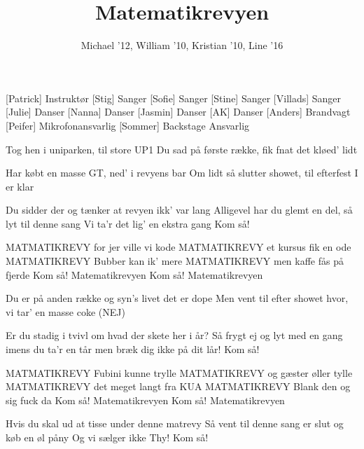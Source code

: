 \documentclass[a4paper,11pt]{article}
\title{Matematikrevyen}
\author{Michael '12, William '10, Kristian '10, Line '16}
\begin{document}
\maketitle

\begin{roles}
[Patrick] Instruktør
[Stig] Sanger
[Sofie] Sanger
[Stine] Sanger
[Villads] Sanger
[Julie] Danser
[Nanna] Danser
[Jasmin] Danser
[AK] Danser
[Anders] Brandvagt
[Peifer] Mikrofonansvarlig
[Sommer] Backstage Ansvarlig
\end{roles}

\begin{song}
 Tog hen i uniparken, til store UP1
 Du sad på første række, fik fnat det kløed' lidt

 Har købt en masse GT, ned' i revyens bar 
  Om lidt så slutter showet, til efterfest I er klar

 Du sidder der og tænker at revyen ikk' var lang
Alligevel har du glemt en del, så lyt til denne sang
 Vi ta'r det lig' en ekstra gang
 Kom så!

 MATMATIKREVY 
 for jer ville vi kode
 MATMATIKREVY 
 et kursus fik en ode
 MATMATIKREVY 
 Bubber kan ik' mere
 MATMATIKREVY
 men kaffe fås på fjerde
 Kom så!
 Matematikrevyen
 Kom så!
Matematikrevyen

 Du er på anden række og syn's livet det er dope
 Men vent til efter showet hvor, vi tar' en masse coke  (NEJ)

 Er du stadig i tvivl om hvad der skete her i år?
Så frygt ej og lyt med en gang imens du ta'r en tår
 men bræk dig ikke på dit lår!
 Kom så!

 MATMATIKREVY
 Fubini kunne trylle
 MATMATIKREVY
 og gæster øller tylle
 MATMATIKREVY
 det meget langt fra KUA
 MATMATIKREVY
 Blank den og sig fuck da
 Kom så!
 Matematikrevyen
 Kom så!
 Matematikrevyen

 Hvis du skal ud at tisse under denne matrevy
Så vent til denne sang er slut og køb en øl påny
 Og vi sælger ikke Thy!
 Kom så!


\end{song}
\end{document}
